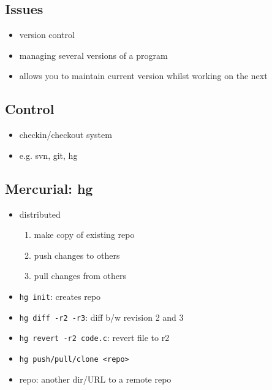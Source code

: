\documentclass[10pt, multicolumn, a4paper]{article}
\begin{document}
\begin{multicols}{2}
	\subsection*{Issues}
	\begin{itemize}
	\item version control
	\item managing several versions of a program
	\item allows you to maintain current version whilst working on the next
	\end{itemize}
	\subsection*{Control}
	\begin{itemize}
	\item checkin/checkout system
	\item e.g. svn, git, hg
	\end{itemize}
	\subsection*{Mercurial: hg}
	\begin{itemize}
	\item distributed
		\begin{enumerate}
		\item make copy of existing repo
		\item push changes to others
		\item pull changes from others
		\end{enumerate}
	\item \verb|hg init|: creates repo
	\item \verb|hg diff -r2 -r3|: diff b/w revision 2 and 3
	\item \verb|hg revert -r2 code.c|: revert file to r2
	\item \verb|hg push/pull/clone <repo>|
	\item repo: another dir/URL to a remote repo
	\end{itemize}
\end{multicols}
\end{document}

